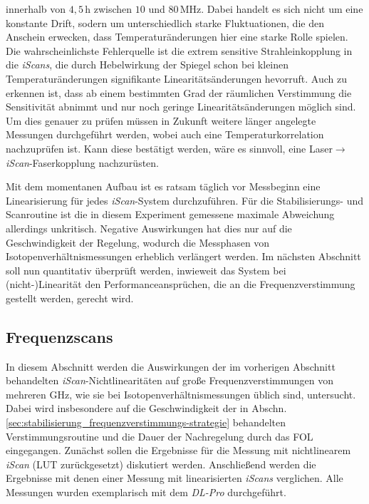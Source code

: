innerhalb von $4,5\,$h zwischen $10$ und $80\,$MHz. Dabei handelt es sich
nicht um eine konstante Drift, sodern um unterschiedlich starke Fluktuationen,
die den Anschein erwecken, dass Temperaturänderungen hier eine starke Rolle
spielen. Die wahrscheinlichste Fehlerquelle ist die extrem sensitive
Strahleinkopplung in die \textit{iScans}, die durch Hebelwirkung der Spiegel
schon bei kleinen Temperaturänderungen signifikante Linearitätsänderungen hevorruft. Auch zu
erkennen ist, dass ab einem bestimmten Grad der räumlichen Verstimmung die
Sensitivität abnimmt und nur noch geringe Linearitätsänderungen möglich sind. Um
dies genauer zu prüfen müssen in Zukunft weitere länger angelegte Messungen
durchgeführt werden, wobei auch eine Temperaturkorrelation nachzuprüfen ist.
Kann diese bestätigt werden, wäre es sinnvoll, eine Laser$\rightarrow$\textit{iScan}-Faserkopplung nachzurüsten.\par
Mit dem momentanen Aufbau ist es ratsam täglich vor Messbeginn eine
Linearisierung für jedes \textit{iScan}-System durchzuführen. Für die
Stabilisierungs- und Scanroutine ist die in diesem Experiment gemessene maximale Abweichung
allerdings unkritisch. Negative Auswirkungen hat dies nur auf die Geschwindigkeit der
Regelung, wodurch die Messphasen von Isotopenverhältnismessungen erheblich
verlängert werden. Im nächsten Abschnitt soll nun quantitativ überprüft werden,
inwieweit das System bei (nicht-)Linearität den Performanceansprüchen, die an
die Frequenzverstimmung gestellt werden, gerecht wird.

\subsection{Frequenzscans}\label{sec:frequenz_scans}
In diesem Abschnitt werden die Auswirkungen der im vorherigen Abschnitt
behandelten \textit{iScan}-Nichtlinearitäten auf große Frequenzverstimmungen
von mehreren GHz, wie sie bei Isotopenverhältnismessungen üblich sind,
untersucht. Dabei wird insbesondere auf die Geschwindigkeit der in Abschn.
\ref{sec:stabilisierung_frequenzverstimmungs-strategie}
behandelten Verstimmungsroutine und die Dauer der Nachregelung durch das FOL
eingegangen. Zunächst sollen die Ergebnisse für die Messung mit nichtlinearem
\textit{iScan} (LUT zurückgesetzt) diskutiert werden. Anschließend werden die
Ergebnisse mit denen einer Messung mit linearisierten \textit{iScans}
verglichen. Alle Messungen wurden exemplarisch mit dem \textit{DL-Pro}
durchgeführt.

